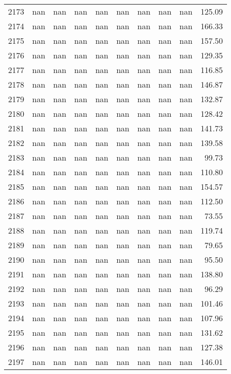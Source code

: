 \begin{tabular}{lrrrrrrrrr}
2173 & nan & nan & nan & nan & nan & nan & nan & nan & 125.09 \\
2174 & nan & nan & nan & nan & nan & nan & nan & nan & 166.33 \\
2175 & nan & nan & nan & nan & nan & nan & nan & nan & 157.50 \\
2176 & nan & nan & nan & nan & nan & nan & nan & nan & 129.35 \\
2177 & nan & nan & nan & nan & nan & nan & nan & nan & 116.85 \\
2178 & nan & nan & nan & nan & nan & nan & nan & nan & 146.87 \\
2179 & nan & nan & nan & nan & nan & nan & nan & nan & 132.87 \\
2180 & nan & nan & nan & nan & nan & nan & nan & nan & 128.42 \\
2181 & nan & nan & nan & nan & nan & nan & nan & nan & 141.73 \\
2182 & nan & nan & nan & nan & nan & nan & nan & nan & 139.58 \\
2183 & nan & nan & nan & nan & nan & nan & nan & nan & 99.73 \\
2184 & nan & nan & nan & nan & nan & nan & nan & nan & 110.80 \\
2185 & nan & nan & nan & nan & nan & nan & nan & nan & 154.57 \\
2186 & nan & nan & nan & nan & nan & nan & nan & nan & 112.50 \\
2187 & nan & nan & nan & nan & nan & nan & nan & nan & 73.55 \\
2188 & nan & nan & nan & nan & nan & nan & nan & nan & 119.74 \\
2189 & nan & nan & nan & nan & nan & nan & nan & nan & 79.65 \\
2190 & nan & nan & nan & nan & nan & nan & nan & nan & 95.50 \\
2191 & nan & nan & nan & nan & nan & nan & nan & nan & 138.80 \\
2192 & nan & nan & nan & nan & nan & nan & nan & nan & 96.29 \\
2193 & nan & nan & nan & nan & nan & nan & nan & nan & 101.46 \\
2194 & nan & nan & nan & nan & nan & nan & nan & nan & 107.96 \\
2195 & nan & nan & nan & nan & nan & nan & nan & nan & 131.62 \\
2196 & nan & nan & nan & nan & nan & nan & nan & nan & 127.38 \\
2197 & nan & nan & nan & nan & nan & nan & nan & nan & 146.01 \\

\end{tabular}

